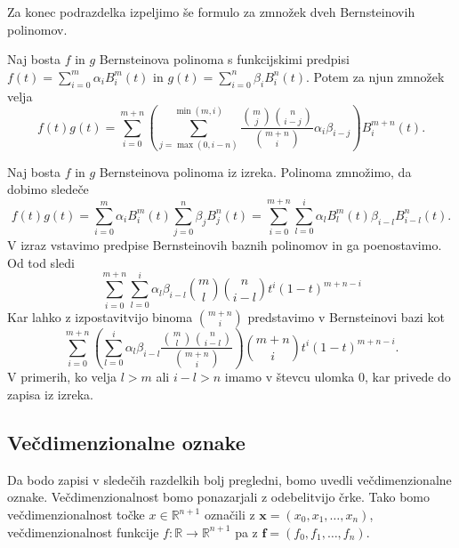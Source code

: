 \documentclass[isrm2, tisk]{fmfdelo}
\newcommand{\R}{\mathbb R}
\begin{document}
    Za konec podrazdelka izpeljimo še formulo za zmnožek dveh Bernsteinovih polinomov.
    \begin{izrek}
        Naj bosta $f$ in $g$ Bernsteinova polinoma s funkcijskimi predpisi $f(t)=\sum_{i=0}^{m}\alpha_iB_i^m(t)$ in $g(t)=\sum_{i=0}^{n}\beta_iB_i^n(t)$.
        Potem za njun zmnožek velja
        \[ f(t)g(t) = \sum_{i=0}^{m+n}\left(\sum_{j=\max(0,i-n)}^{\min(m,i)} \frac{\binom{m}{j}\binom{n}{i-j}}{\binom{m+n}{i}} \alpha_i\beta_{i-j} \right)B_{i}^{m+n}(t).\]
    \end{izrek}
    \begin{dokaz}
        Naj bosta $f$ in $g$ Bernsteinova polinoma iz izreka.
        Polinoma zmnožimo, da dobimo sledeče
        \[f(t)g(t) =\sum_{i=0}^{m}\alpha_iB_{i}^{m}(t)\sum_{j=0}^{n}\beta_jB_{j}^{n}(t) = \sum_{i=0}^{m+n}\sum_{l=0}^i \alpha_lB_{l}^{m}(t)\beta_{i-l}B_{i-l}^{n}(t). \]
        V izraz vstavimo predpise Bernsteinovih baznih polinomov in ga poenostavimo.
        Od tod sledi
        \[\sum_{i=0}^{m+n}\sum_{l=0}^i \alpha_l \beta_{i-l} \binom{m}{l}\binom{n}{i-l}t^{i}(1-t)^{m+n-i}\]
        Kar lahko z izpostavitvijo binoma $\binom{m+n}{i}$ predstavimo v Bernsteinovi bazi kot
        \[\sum_{i=0}^{m+n} \left(\sum_{l=0}^i  \alpha_l \beta_{i-l}\frac{\binom{m}{l}\binom{n}{i-l}}{\binom{m+n}{i}}\right) \binom{m+n}{i} t^{i}(1-t)^{m+n-i}.\]
        V primerih, ko velja $l>m$ ali $i-l>n$ imamo v števcu ulomka $0$, kar privede do zapisa iz izreka.
    \end{dokaz}

    \subsection{Večdimenzionalne oznake}
    Da bodo zapisi v sledečih razdelkih bolj pregledni, bomo uvedli večdimenzionalne oznake.
    Večdimenzionalnost bomo ponazarjali z odebelitvijo črke.
    Tako bomo večdimenzionalnost točke $x\in\R^{n+1}$ označili z $\mathbf{x}=(x_0,x_1,\dots,x_n)$, večdimenzionalnost funkcije $f:\R\to\R^{n+1}$ pa z $\mathbf{f}=\left( f_0,f_1,\dots,f_n\right)$.
\end{document}
